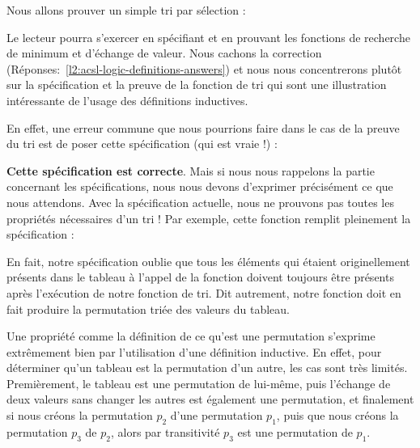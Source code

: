 \label{l3:acsl-logic-definitions-inductive-sort}




Nous allons prouver un simple tri par sélection :





Le lecteur pourra s'exercer en spécifiant et en prouvant les fonctions de
recherche de minimum et d'échange de valeur. Nous cachons la correction
(Réponses:~\ref{l2:acsl-logic-definitions-answers}) et nous nous concentrerons
plutôt sur la spécification et la preuve de la fonction de tri qui sont une
illustration intéressante de l'usage des définitions inductives.


En effet, une erreur commune que nous pourrions faire dans le cas de la preuve
du tri est de poser cette spécification (qui est vraie !) :






\textbf{Cette spécification est correcte}. Mais si nous nous rappelons la
partie concernant les spécifications, nous nous devons d'exprimer précisément ce
que nous attendons. Avec la spécification actuelle, nous ne prouvons pas toutes
les propriétés nécessaires d'un tri ! Par exemple, cette fonction remplit
pleinement la spécification :






En fait, notre spécification oublie que tous les éléments qui étaient
originellement présents dans le tableau à l'appel de la fonction doivent
toujours être présents après l'exécution de notre fonction de tri. Dit
autrement, notre fonction doit en fait produire la permutation triée des
valeurs du tableau.



Une propriété comme la définition de ce qu'est une permutation s'exprime
extrêmement bien par l'utilisation d'une définition inductive. En effet, pour
déterminer qu'un tableau est la permutation d'un autre, les cas sont très limités.
Premièrement, le tableau est une permutation de lui-même, puis l'échange de
deux valeurs sans changer les autres est également une permutation, et
finalement si nous créons la permutation $p_2$ d'une permutation $p_1$, puis que
nous créons la permutation $p_3$ de $p_2$, alors par transitivité $p_3$ est une
permutation de $p_1$.




